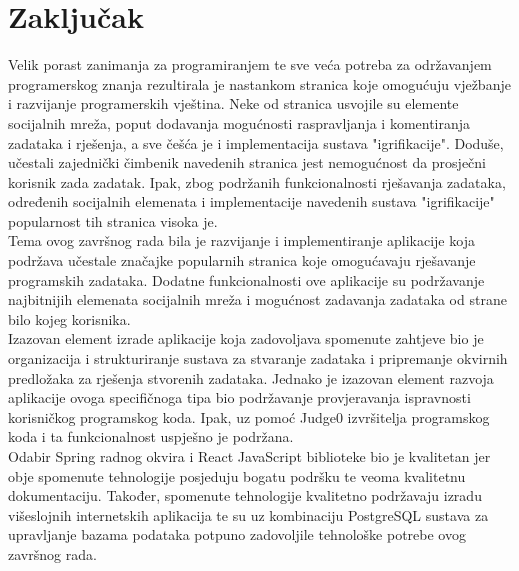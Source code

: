 \documentclass[times, utf8, zavrsni, numeric]{fer}
\begin{document}
	\chapter{Zaključak}
	Velik porast zanimanja za programiranjem te sve veća potreba za održavanjem programerskog znanja rezultirala je nastankom stranica koje omogućuju vježbanje i razvijanje programerskih vještina. Neke od stranica usvojile su elemente socijalnih mreža, poput dodavanja mogućnosti raspravljanja i komentiranja zadataka i rješenja, a sve češća je i implementacija sustava "igrifikacije". Doduše, učestali zajednički čimbenik navedenih stranica jest nemogućnost da prosječni korisnik zada zadatak. Ipak, zbog podržanih funkcionalnosti rješavanja zadataka, određenih socijalnih elemenata i implementacije navedenih sustava "igrifikacije" popularnost tih stranica visoka je.\\
	Tema ovog završnog rada bila je razvijanje i implementiranje aplikacije koja podržava učestale značajke popularnih stranica koje omogućavaju rješavanje programskih zadataka. Dodatne funkcionalnosti ove aplikacije su podržavanje najbitnijih elemenata socijalnih mreža i mogućnost zadavanja zadataka od strane bilo kojeg korisnika. \\
	Izazovan element izrade aplikacije koja zadovoljava spomenute zahtjeve bio je organizacija i strukturiranje sustava za stvaranje zadataka i pripremanje okvirnih predložaka za rješenja stvorenih zadataka. Jednako je izazovan element razvoja aplikacije ovoga specifičnoga tipa bio podržavanje provjeravanja ispravnosti korisničkog programskog koda. Ipak, uz pomoć Judge0 izvršitelja programskog koda i ta funkcionalnost uspješno je podržana.\\
	Odabir Spring radnog okvira i React JavaScript biblioteke bio je kvalitetan jer obje spomenute tehnologije posjeduju bogatu podršku te veoma kvalitetnu dokumentaciju. Također, spomenute tehnologije kvalitetno podržavaju izradu višeslojnih internetskih aplikacija te su uz kombinaciju PostgreSQL sustava za upravljanje bazama podataka potpuno zadovoljile tehnološke potrebe ovog završnog rada.\\
	
	
	

	
	
	
	\begin{sazetak}
		
		
	\end{sazetak}
	
	\begin{abstract}
		
		
	\end{abstract}
	
\end{document}
